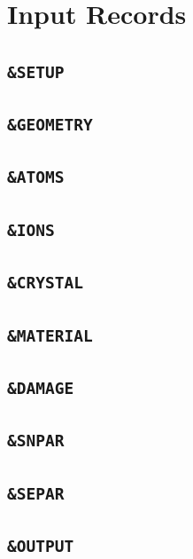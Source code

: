 \documentclass[twoside,12pt]{book}
\begin{document}
\chapter{Input Records}
\label{k:input}

%
\newpage
\section{\texttt{\&SETUP} ~}
\label{s:setup}

%
\newpage
\section{\texttt{\&GEOMETRY} ~}
\label{s:geom}

%
\newpage
\section{\texttt{\&ATOMS} ~}
\label{s:atom}

%
\newpage
\section{\texttt{\&IONS} ~}
\label{s:ion}

%
\newpage
\section{\texttt{\&CRYSTAL} ~}
\label{s:xtal}

%
\newpage
\section{\texttt{\&MATERIAL} ~}
\label{s:target}

%
\newpage
\section{\texttt{\&DAMAGE} ~}
\label{s:damage}

%
\newpage
\section{\texttt{\&SNPAR} ~}
\label{s:snpar}

%
\newpage
\section{\texttt{\&SEPAR} ~}
\label{s:separ}

%
\newpage
\section{\texttt{\&OUTPUT} ~}
\label{s:output}

%
%
\end{document}
